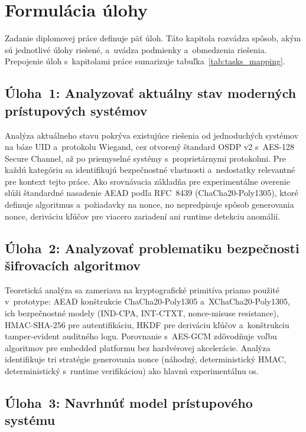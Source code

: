 \section{Formulácia úlohy}

Zadanie diplomovej práce definuje päť úloh. Táto kapitola rozvádza spôsob, akým sú jednotlivé úlohy riešené, a~uvádza podmienky a~obmedzenia riešenia. Prepojenie úloh s~kapitolami práce sumarizuje tabuľka~\ref{tab:tasks_mapping}.

\subsection{Úloha~1: Analyzovať aktuálny stav moderných prístupových systémov}

Analýza aktuálneho stavu pokrýva existujúce riešenia od jednoduchých systémov na báze UID a~protokolu Wiegand, cez otvorený štandard OSDP v2 s~AES-128 Secure Channel, až po priemyselné systémy s~proprietárnymi protokolmi. Pre každú kategóriu sa identifikujú bezpečnostné vlastnosti a~nedostatky relevantné pre kontext tejto práce. Ako srovnávacia základňa pre experimentálne overenie slúži štandardné nasadenie AEAD podľa RFC~8439 (ChaCha20-Poly1305), ktoré definuje algoritmus a~požiadavky na nonce, no nepredpisuje spôsob generovania nonce, deriváciu kľúčov pre viacero zariadení ani runtime detekciu anomálií.

\subsection{Úloha~2: Analyzovať problematiku bezpečnosti šifrovacích algoritmov}

Teoretická analýza sa zameriava na kryptografické primitíva priamo použité v~prototype: AEAD konštrukcie ChaCha20-Poly1305 a~XChaCha20-Poly1305, ich bezpečnostné modely (IND-CPA, INT-CTXT, nonce-misuse resistance), HMAC-SHA-256 pre autentifikáciu, HKDF pre deriváciu kľúčov a~konštrukciu tamper-evident auditného logu. Porovnanie s~AES-GCM zdôvodňuje voľbu algoritmov pre embedded platformu bez hardvérovej akcelerácie. Analýza identifikuje tri stratégie generovania nonce (náhodný, deterministický HMAC, deterministický s~runtime verifikáciou) ako hlavnú experimentálnu os.

\subsection{Úloha~3: Navrhnúť model prístupového systému}


